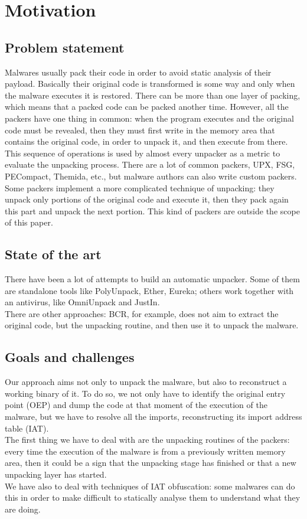 \chapter{Motivation}
\label{chapter2}
\thispagestyle{empty}

\section{Problem statement}
Malwares usually pack their code in order to avoid static analysis of their payload. Basically their original code is transformed is some way and only when the malware executes it is restored. There can be more than one layer of packing, which means that a packed code can be packed another time. However, all the packers have one thing in common: when the program executes and the original code must be revealed, then they must first write in the memory area that contains the original code, in order to unpack it, and then execute from there. This sequence of operations is used by almost every unpacker as a metric to evaluate the unpacking process. There are a lot of common packers, UPX, FSG, PECompact, Themida, etc., but malware authors can also write custom packers.\\
Some packers implement a more complicated technique of unpacking: they unpack only portions of the original code and execute it, then they pack again this part and unpack the next portion. This kind of packers are outside the scope of this paper.

\section{State of the art}
There have been a lot of attempts to build an automatic unpacker. Some of them are standalone tools like PolyUnpack, Ether, Eureka; others work together with an antivirus, like OmniUnpack and JustIn.\\
There are other approaches: BCR, for example, does not aim to extract the original code, but the unpacking routine, and then use it to unpack the malware.

\section{Goals and challenges}
Our approach aims not only to unpack the malware, but also to reconstruct a working binary of it. To do so, we not only have to identify the original entry point (OEP) and dump the code at that moment of the execution of the malware, but we have to resolve all the imports, reconstructing its import address table (IAT).\\
The first thing we have to deal with are the unpacking routines of the packers: every time the execution of the malware is from a previously written memory area, then it could be a sign that the unpacking stage has finished or that a new unpacking layer has started.\\
We have also to deal with techniques of IAT obfuscation: some malwares can do this in order to make difficult to statically analyse them to understand what they are doing.

